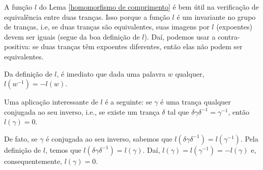 	\begin{remark}
		A função $l$ do Lema \ref{homomorfismo de comprimento} é bem útil na verificação de equivalência 
		entre duas tranças. Isso porque a função $l$ é um invariante no grupo de tranças, i.e, se duas tranças 
		são equivalentes, suas imagens por $l$ (expoentes) devem ser iguais (segue da boa definição de $l$). 
		Daí, podemos usar a contra-positiva: se duas tranças têm expoentes diferentes, então elas não podem 
		ser equivalentes.
	\end{remark}
	Da definição de $l$, é imediato que dada uma palavra $w$ qualquer, $l(w^{-1}) = -l(w)$.
	
	\par\vspace{0.3cm} Uma aplicação interessante de $l$ é a seguinte: se $\gamma$ é uma trança qualquer 
	conjugada ao seu inverso, i.e., se existe um trança $\delta$ tal que $\delta\gamma\delta^{-1} = \gamma^{-1}$,
	então $l(\gamma) = 0$.
	
	\par\vspace{0.3cm} De fato, se $\gamma$ é conjugada ao seu inverso, sabemos que $l(\delta\gamma\delta^{-1}) 
	= l(\gamma^{-1})$. Pela definição de $l$, temos que $l(\delta\gamma\delta^{-1}) = l(\gamma)$. Daí, 
	$l(\gamma) = l(\gamma^{-1}) = -l(\gamma)$ e, consequentemente, $l(\gamma) = 0$.
	
